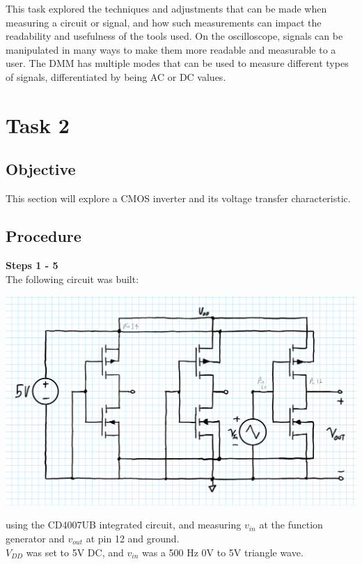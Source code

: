 \documentclass[notitlepage, 12pt]{report}  %
\begin{document}
\indent\indent This task explored the techniques and adjustments that can be made when measuring a circuit or signal,
and how such measurements can impact the readability and usefulness of the tools used. On the oscilloscope, 
signals can be manipulated in many ways to make them more readable and measurable to a user. The DMM has
multiple modes that can be used to measure different types of signals, differentiated by being AC or DC 
values.\\



\section*{Task 2}

\subsection*{Objective}
\indent\indent This section will explore a CMOS inverter and its voltage transfer characteristic. 
\subsection*{Procedure}
\textbf{Steps 1 - 5}\\

The following circuit was built:


\begin{center}
    \includegraphics[scale=0.35]{singleInverter.png}
\end{center}

using the CD4007UB integrated circuit, and measuring $v_{in}$ at the function generator and $v_{out}$ at pin 12 and ground.\\
$V_{DD}$ was set to 5V DC, and $v_{in}$ was a 500 Hz 0V to 5V triangle wave.\\
\end{document}
